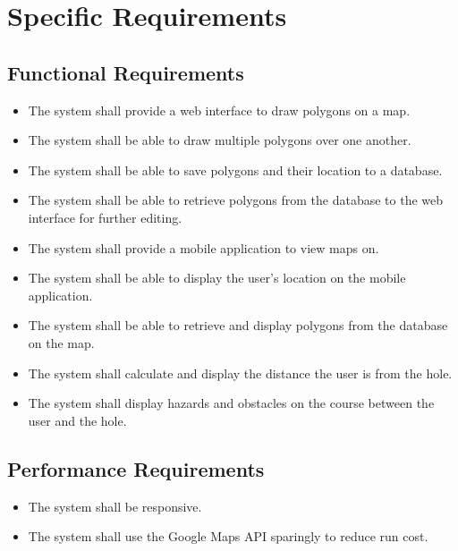 \documentclass[12]{article}
\begin{document}
\section{Specific Requirements}
\subsection{Functional Requirements}
\begin{itemize}
	\item
	The system shall provide a web interface to draw polygons on a map.
	\item
	The system shall be able to draw multiple polygons over one another.
	\item
	The system shall be able to save polygons and their location to a database.
	\item
	The system shall be able to retrieve polygons from the database to the web interface for further editing.
	\item
	The system shall provide a mobile application to view maps on.
	\item
	The system shall be able to display the user's location on the mobile application.
	\item
	The system shall be able to retrieve and display polygons from the database on the map.
	\item
	The system shall calculate and display the distance the user is from the hole.
	\item
	The system shall display hazards and obstacles on the course between the user and the hole.
\end{itemize}
\subsection{Performance Requirements}
\begin{itemize}
	\item
	The system shall be responsive.
	\item
	The system shall use the Google Maps API sparingly to reduce run cost.
	
\end{itemize}
\end{document}
